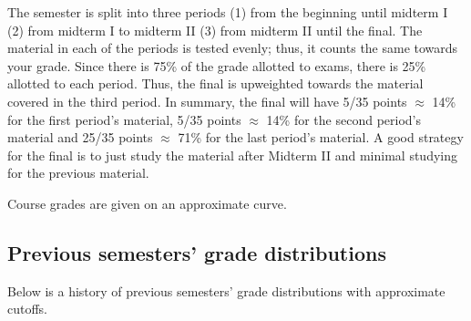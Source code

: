 \documentclass[12pt]{article}
\begin{document}
The semester is split into three periods (1) from the beginning until midterm I (2) from midterm I to midterm II (3) from midterm II until the final. The material in each of the periods is tested evenly; thus, it counts the same towards your grade. Since there is 75\% of the grade allotted to exams, there is 25\% allotted to each period. Thus, the final is upweighted towards the material covered in the third period. In summary, the final will have 5/35 points $\approx$ 14\% for the first period's material, 5/35 points $\approx$ 14\% for the second period's material and 25/35 points $\approx$ 71\% for the last period's material. A good strategy for the final is to just study the material after Midterm II and minimal studying for the previous material.

Course grades are given on an approximate curve.

\subsection*{Previous semesters' grade distributions}

Below is a history of previous semesters' grade distributions with approximate cutoffs.
\end{document}
